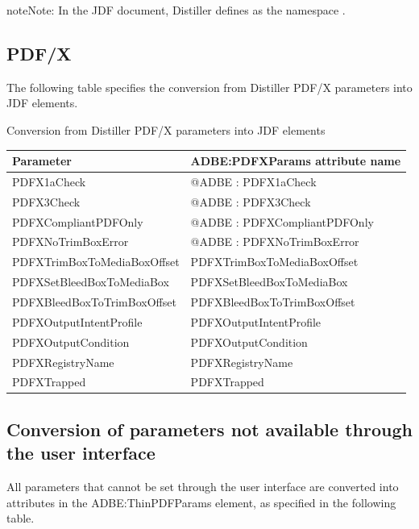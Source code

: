 \documentclass[letterpaper,12pt,english,openany,oneside]{sphinxmanual}
\begin{document}
\begin{sphinxadmonition}{note}{Note:}
In the JDF document, Distiller defines  as the namespace  .
\end{sphinxadmonition}


\subsection{PDF/X}
\label{\detokenize{PDF_Create_JDF:pdf-x}}
The following table specifies the conversion from Distiller PDF/X parameters into JDF elements.

Conversion from Distiller PDF/X parameters into JDF elements


\begin{savenotes}\sphinxattablestart
\centering
{}\label{\detokenize{PDF_Create_JDF:section-11}}\nobreak
\begin{tabulary}{\linewidth}[t]{|T|T|}
\hline
\sphinxstyletheadfamily 
Parameter
&\sphinxstyletheadfamily 
ADBE:PDFXParams attribute name
\\
\hline
PDFX1aCheck
&
@ADBE : PDFX1aCheck
\\
\hline
PDFX3Check
&
@ADBE : PDFX3Check
\\
\hline
PDFXCompliantPDFOnly
&
@ADBE : PDFXCompliantPDFOnly
\\
\hline
PDFXNoTrimBoxError
&
@ADBE : PDFXNoTrimBoxError
\\
\hline
PDFXTrimBoxToMediaBoxOffset
&
PDFXTrimBoxToMediaBoxOffset
\\
\hline
PDFXSetBleedBoxToMediaBox
&
PDFXSetBleedBoxToMediaBox
\\
\hline
PDFXBleedBoxToTrimBoxOffset
&
PDFXBleedBoxToTrimBoxOffset
\\
\hline
PDFXOutputIntentProfile
&
PDFXOutputIntentProfile
\\
\hline
PDFXOutputCondition
&
PDFXOutputCondition
\\
\hline
PDFXRegistryName
&
PDFXRegistryName
\\
\hline
PDFXTrapped
&
PDFXTrapped
\\
\hline
\end{tabulary}
\par
\sphinxattableend\end{savenotes}


\subsection{Conversion of parameters not available through the user interface}
\label{\detokenize{PDF_Create_JDF:conversion-of-parameters-not-available-through-the-user-interface}}
All parameters that cannot be set through the user interface are converted into attributes in the ADBE:ThinPDFParams element, as specified in the following table.
\end{document}
